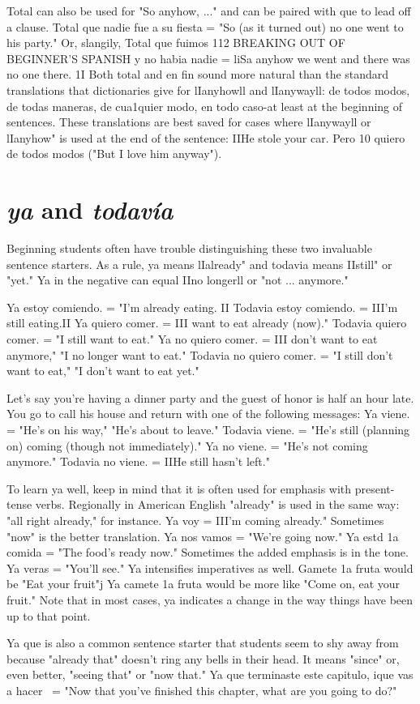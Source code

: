 Total can also be used for "So anyhow, ..." and can be paired
with que to lead off a clause. Total que nadie fue a su fiesta = "So (as
it turned out) no one went to his party." Or, slangily, Total que fuimos
112 BREAKING OUT OF BEGINNER'S SPANISH
y no habia nadie = liSa anyhow we went and there was no one there. 1I
Both total and en fin sound more natural than the standard translations that dictionaries give for lIanyhowll and lIanywayll: de todos modos, de todas maneras, de cua1quier modo, en todo caso-at least at
the beginning of sentences. These translations are best saved for cases
where lIanywayll or lIanyhow" is used at the end of the sentence:
IIHe stole your car. Pero 10 quiero de todos modos ("But I love him
anyway").

\section{\emph{ya} and \emph{todavía}}

Beginning students often have trouble distinguishing these
two invaluable sentence starters. As a rule, ya means lIalready" and todavia means IIstill" or "yet." Ya in the negative can equal IIno longerll
or "not ... anymore."

\bsk

Ya estoy comiendo. = "I'm already eating. II
Todavia estoy comiendo. = III'm still eating.II
Ya quiero comer. = III want to eat already (now)."
Todavia quiero comer. = "I still want to eat."
Ya no quiero comer. = III don't want to eat anymore,"
"I no longer want to eat."
Todavia no quiero comer. = "I still don't want to eat,"
"I don't want to eat yet."

\bsk

Let's say you're having a dinner party and the guest of honor is half an
hour late. You go to call his house and return with one of the following
messages:
Ya viene. = "He's on his way," "He's about to leave."
Todavia viene. = "He's still (planning on) coming (though not
immediately)."
Ya no viene. = "He's not coming anymore."
Todavia no viene. = IIHe still hasn't left."

\bsk

To learn ya well, keep in mind that it is often used for emphasis with
present-tense verbs. Regionally in American English "already" is used
in the same way: "all right already," for instance. Ya voy = III'm coming already." Sometimes "now" is the better translation. Ya nos vamos
= "We're going now." Ya estd 1a comida = "The food's ready now."
Sometimes the added emphasis is in the tone. Ya veras = "You'll see."
Ya intensifies imperatives as well. Gamete 1a fruta would be "Eat your
fruit"j Ya camete 1a fruta would be more like "Come on, eat your
fruit." Note that in most cases, ya indicates a change in the way things
have been up to that point.

Ya que is also a common sentence starter that students seem
to shy away from because "already that" doesn't ring any bells in their
head. It means "since" or, even better, "seeing that" or "now that." Ya
que terminaste este capitulo, ique vas a hacer~ = "Now that you've
finished this chapter, what are you going to do?"

